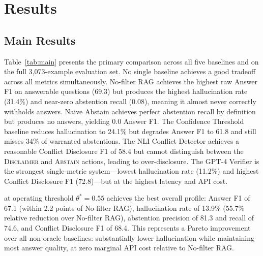 \section{Results}
\label{sec:results}

\subsection{Main Results}

Table~\ref{tab:main} presents the primary comparison across all five baselines and \method{} on the full 3,073-example evaluation set. No single baseline achieves a good tradeoff across all metrics simultaneously. No-filter RAG achieves the highest raw Answer F1 on answerable questions (69.3) but produces the highest hallucination rate (31.4\%) and near-zero abstention recall (0.08), meaning it almost never correctly withholds answers. Naive Abstain achieves perfect abstention recall by definition but produces no answers, yielding 0.0 Answer F1. The Confidence Threshold baseline reduces hallucination to 24.1\% but degrades Answer F1 to 61.8 and still misses 34\% of warranted abstentions. The NLI Conflict Detector achieves a reasonable Conflict Disclosure F1 of 58.4 but cannot distinguish between the \textsc{Disclaimer} and \textsc{Abstain} actions, leading to over-disclosure. The GPT-4 Verifier is the strongest single-metric system---lowest hallucination rate (11.2\%) and highest Conflict Disclosure F1 (72.8)---but at the highest latency and API cost.

\method{} at operating threshold $\theta^* = 0.55$ achieves the best overall profile: Answer F1 of 67.1 (within 2.2 points of No-filter RAG), hallucination rate of 13.9\% (55.7\% relative reduction over No-filter RAG), abstention precision of 81.3 and recall of 74.6, and Conflict Disclosure F1 of 68.4. This represents a Pareto improvement over all non-oracle baselines: substantially lower hallucination while maintaining most answer quality, at zero marginal API cost relative to No-filter RAG.

